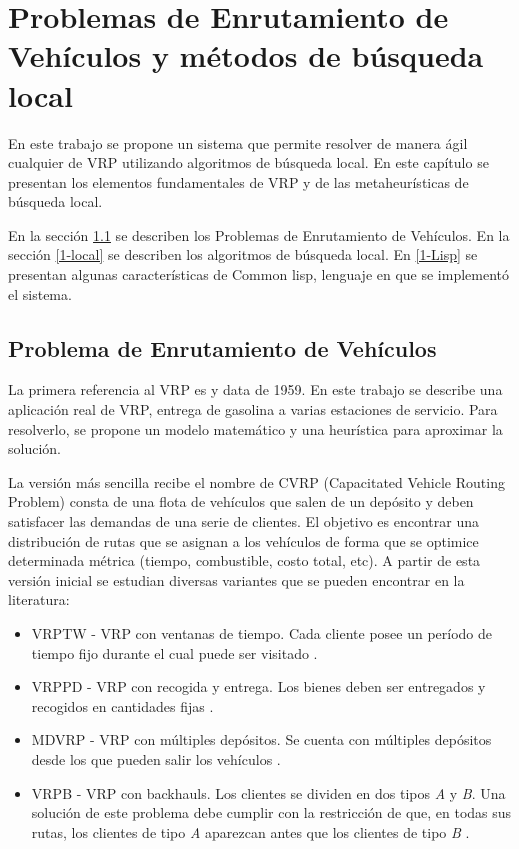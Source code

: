 \chapter{Problemas de Enrutamiento de Vehículos y métodos de búsqueda local}\label{chapter: VRP}

En este trabajo se propone un sistema que permite resolver de manera ágil cualquier de VRP utilizando algoritmos de búsqueda local. En este capítulo se presentan los elementos fundamentales de VRP y de las metaheurísticas de búsqueda local.

En la sección \ref{1-VRPintro} se describen los Problemas de Enrutamiento de Vehículos. En la sección \ref{1-local} se describen los algoritmos de búsqueda local. En \ref{1-Lisp} se presentan algunas características de Common lisp, lenguaje en que se implementó el sistema.


\section{Problema de Enrutamiento de Vehículos}\label{1-VRPintro}
La primera referencia al VRP es \cite{CVRP} y data de 1959. En este trabajo se describe una aplicación real de VRP, entrega de gasolina a varias estaciones de servicio. Para resolverlo, se propone un modelo matemático y una heurística para aproximar la solución.

La versión más sencilla recibe el nombre de CVRP (Capacitated Vehicle Routing Problem) \cite{CVRP} consta de una flota de vehículos que salen de un depósito y deben satisfacer las demandas de una serie de clientes. El objetivo es encontrar una distribución de rutas que se asignan a los vehículos de forma que se optimice determinada métrica (tiempo, combustible, costo total, etc). A partir de esta versión inicial se estudian diversas variantes que se pueden encontrar en la literatura:

\begin{itemize}
	\item VRPTW - VRP con ventanas de tiempo. Cada cliente posee un período de tiempo fijo durante el cual puede ser visitado \cite{VRPTW}.
	\item VRPPD - VRP con recogida y entrega. Los bienes deben ser entregados y recogidos en cantidades fijas \cite{VRPPD}.
	\item MDVRP - VRP con múltiples depósitos. Se cuenta con múltiples depósitos desde los que pueden salir los vehículos \cite{multi}.
	\item VRPB - VRP con backhauls. Los clientes se dividen en dos tipos \textit{A} y \textit{B}. Una solución de este problema debe cumplir con la restricción de que, en todas sus rutas, los clientes de tipo \textit{A} aparezcan antes que los clientes de tipo \textit{B} \cite{backhauls1998}.
\end{itemize}

